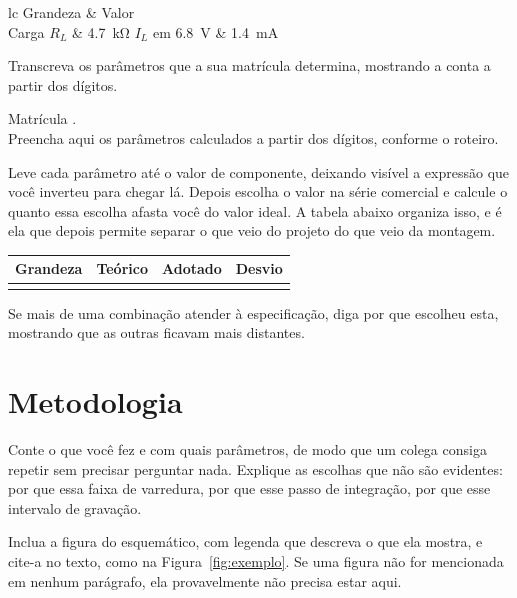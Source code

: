 \documentclass[11pt,a4paper]{article}
\begin{document}
\begin{table}[h]
\centering
\caption{Especificação da equipe~2 para a bancada.}
\label{tab:equipe_r5}
\begin{tabular}{lc}
\hline
Grandeza & Valor \\
\hline
	Carga $R_L$ & \SI{4,7}{\kilo\ohm}
	$I_L$ em \SI{6,8}{\volt} & \SI{1,4}{\milli\ampere}
\hline
\end{tabular}
\end{table}

Transcreva os parâmetros que a sua matrícula determina, mostrando a conta a partir dos
dígitos.

\begin{espec}
Matrícula . \\
Preencha aqui os parâmetros calculados a partir dos dígitos, conforme o roteiro.
\end{espec}

Leve cada parâmetro até o valor de componente, deixando visível a expressão que você
inverteu para chegar lá. Depois escolha o valor na série comercial e calcule o quanto essa
escolha afasta você do valor ideal. A tabela abaixo organiza isso, e é ela que depois
permite separar o que veio do projeto do que veio da montagem.

\begin{center}
\begin{tabular}{@{}lrrr@{}}
\toprule
\textbf{Grandeza} & \textbf{Teórico} & \textbf{Adotado} & \textbf{Desvio} \\
\midrule
& & & \\
\bottomrule
\end{tabular}
\end{center}

Se mais de uma combinação atender à especificação, diga por que escolheu esta, mostrando
que as outras ficavam mais distantes.

\section{Metodologia}

Conte o que você fez e com quais parâmetros, de modo que um colega consiga repetir sem
precisar perguntar nada. Explique as escolhas que não são evidentes: por que essa faixa de
varredura, por que esse passo de integração, por que esse intervalo de gravação.

Inclua a figura do esquemático, com legenda que descreva o que ela mostra, e cite-a no
texto, como na Figura~\ref{fig:exemplo}. Se uma figura não for mencionada em nenhum
parágrafo, ela provavelmente não precisa estar aqui.
\end{document}
